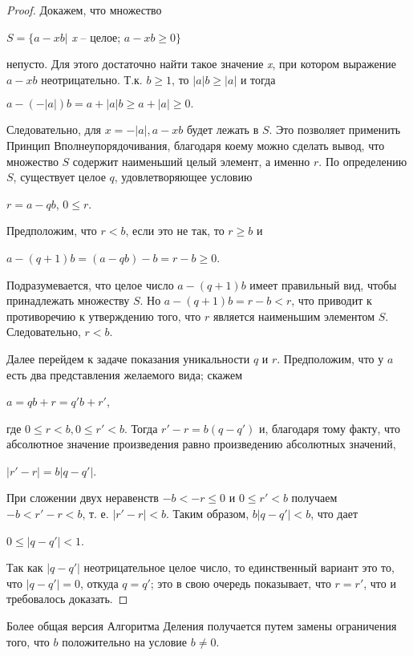 \documentclass[11pt]{article}
\begin{document}
\begin{proof}
Докажем, что множество
\begin{center}
	$S=\{a-xb|$ \textit{x} -- целое; $a-xb\geq0\}$
\end{center} 
непусто. Для этого достаточно найти такое значение \textit{x}, при котором выражение $a-xb$ неотрицательно. Т.к. $b\geq1$, то $|a|b\geq |a|$ и тогда
\begin{center}
	$a-(-|a|)b=a+|a|b\geq a+|a|\geq 0.$
\end{center} 
Следовательно, для $x=-|a|,a-xb$ будет лежать в $S$. Это позволяет применить Принцип Вполнеупорядочивания, благодаря коему можно сделать вывод, что множество $S$ содержит наименьший целый элемент, а именно $r$. По определению $S$, существует целое $q$, удовлетворяющее условию
\begin{flushright}
	$r=a-qb$, \qquad \qquad \qquad \qquad \qquad \qquad $0\leq r$.
\end{flushright}
Предположим, что $r<b$, если это не так, то $r\geq b$ и
\begin{center}
	$a-(q+1)b=(a-qb)-b=r-b\geq 0$.
\end{center}
Подразумевается, что целое число $a-(q+1)b$ имеет правильный вид, чтобы принадлежать множеству $S$. Но $a-(q+1)b=r-b<r$, что приводит к противоречию к утверждению того, что $r$ является наименьшим элементом $S$. Следовательно, $r<b$.

\qquad \quad \thispagestyle{2} Далее перейдем к задаче показания уникальности $q$ и $r$. Предположим, что у $a$ есть два представления желаемого вида; скажем
\begin{center}
	$a=qb+r=q'b+r'$, 
\end{center}
где $0\leq r<b, 0\leq r'<b$. Тогда $r'-r=b(q-q')$ и, благодаря тому факту, что абсолютное значение произведения равно произведению абсолютных значений,
\begin{center}
	$|r'-r|=b|q-q'|$.
\end{center}
При сложении двух неравенств $-b<-r\leq 0$ и $0\leq r'<b$ получаем $-b<r'-r<b$, т. е. $|r'-r|<b$. Таким образом, $b|q-q'|<b$, что дает
\begin{center}
	$0\leq |q-q'|<1$.
\end{center}
Так как $|q-q'|$ неотрицательное целое число, то единственный вариант это то, что $|q-q'|=0$, откуда $q=q'$; это в свою очередь показывает, что $r=r'$, что и требовалось доказать.
\end{proof}

\qquad \quad \leftskip=-0.9cm \rightskip=-0.9cm Более общая версия Алгоритма Деления получается путем замены ограничения того, что $b$ положительно на условие $b\neq 0$.
\end{document}
